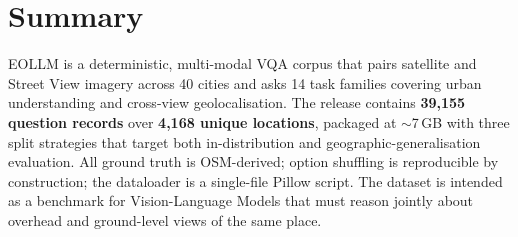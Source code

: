 \documentclass[11pt,a4paper]{article}
\begin{document}
\section{Summary}

EOLLM is a deterministic, multi-modal VQA corpus that pairs satellite
and Street View imagery across 40 cities and asks 14 task families
covering urban understanding and cross-view geolocalisation. The
release contains \textbf{39{,}155 question records} over \textbf{4{,}168
unique locations}, packaged at $\sim$7\,GB with three split strategies
that target both in-distribution and geographic-generalisation
evaluation. All ground truth is OSM-derived; option shuffling is
reproducible by construction; the dataloader is a single-file Pillow
script. The dataset is intended as a benchmark for Vision-Language
Models that must reason jointly about overhead and ground-level views
of the same place.
\end{document}
